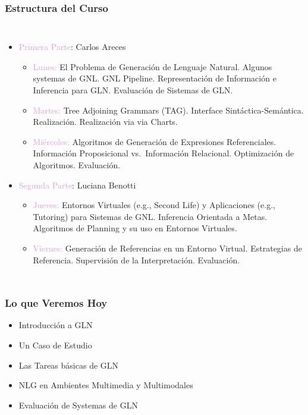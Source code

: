 \documentclass[compress,color=usenames]{beamer}
\newcommand{\mH}[1]{\textcolor{Plum}{#1}}
\begin{document}
\begin{frame}
\frametitle{Estructura del Curso}

\begin{columns}
\begin{itemize}
\item \mH{Primera Parte}: Carlos Areces
\begin{itemize}
\item \mH{Lunes:} El Problema de Generaci\'on de Lenguaje Natural. Algunos systemas de GNL.  GNL Pipeline. Representaci\'on de Informaci\'on e Inferencia para GLN. Evaluaci\'on de Sistemas de GLN.\pause

\item \mH{Martes:} Tree Adjoining Grammars (TAG). Interface Sint\'actica-Sem\'antica.
Realizaci\'on. Realizaci\'on via via Charts. \pause

\item \mH{Mi\'ercoles:} Algoritmos de Generaci\'on de Expresiones Referenciales. Informaci\'on Proposicional vs.\ Informaci\'on Relacional. Optimizaci\'on de Algoritmos. Evaluaci\'on.\pause
\end{itemize}

\item \mH{Segunda Parte}: Luciana Benotti

\begin{itemize}
\item \mH{Jueves:} Entornos Virtuales (e.g., Second Life) y Aplicaciones (e.g., Tutoring) para Sistemas de GNL. Inferencia Orientada a Metas. Algoritmos de Planning y su uso en Entornos Virtuales.\pause

\item \mH{Viernes:} Generaci\'on de Referencias en un Entorno Virtual. Estrategias de Referencia. Supervisi\'on de la Interpretaci\'on. Evaluaci\'on.
\end{itemize}
\end{itemize}
\end{columns}
\end{frame}

\begin{frame}
\frametitle{Lo que Veremos Hoy}

\begin{itemize}
\item  Introducci\'on a GLN 
\item  Un Caso de Estudio
\item  Las Tareas b\'asicas de GLN
\item  NLG en Ambientes Multimedia y Multimodales
\item Evaluaci\'on de Systemas de GLN
\end{itemize}
\end{frame}
\end{document}
